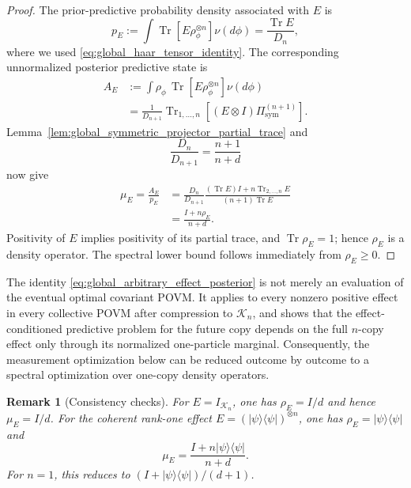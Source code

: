 \documentclass[journal]{IEEEtran}
\newtheorem{remark}[theorem]{Remark}
\newcommand{\ket}[1]{\lvert #1\rangle}
\newcommand{\bra}[1]{\langle #1\rvert}
\begin{document}
\begin{proof}
The prior-predictive probability density associated with \(E\) is
\begin{equation}
    p_E
    :=
    \int
    \operatorname{Tr}\!\left[E\rho_\phi^{\otimes n}\right]\nu(d\phi)
    =
    \frac{\operatorname{Tr}E}{D_n},
    \label{eq:global_effect_prior_predictive_probability}
\end{equation}
where we used \eqref{eq:global_haar_tensor_identity}.  The corresponding
unnormalized posterior predictive state is
\begin{equation}
\begin{split}
    A_E
    &:=
    \int
    \rho_\phi\,
    \operatorname{Tr}\!\left[E\rho_\phi^{\otimes n}\right]\nu(d\phi)\\
    &=
    \frac{1}{D_{n+1}}
    \operatorname{Tr}_{1,\ldots,n}
    \left[
        (E\otimes I)\Pi_{\mathrm{sym}}^{(n+1)}
    \right].
\end{split}
\label{eq:global_effect_unnormalized_posterior}
\end{equation}
Lemma~\ref{lem:global_symmetric_projector_partial_trace} and
\[
    \frac{D_n}{D_{n+1}}=\frac{n+1}{n+d}
\]
now give
\[
\begin{aligned}
    \mu_E
    =\frac{A_E}{p_E}
    &=
    \frac{D_n}{D_{n+1}}
    \frac{(\operatorname{Tr}E)I
    +n\operatorname{Tr}_{2,\ldots,n}E}
    {(n+1)\operatorname{Tr}E}\\
    &=
    \frac{I+n\rho_E}{n+d}.
\end{aligned}
\]
Positivity of \(E\) implies positivity of its partial trace, and
\(\operatorname{Tr}\rho_E=1\); hence \(\rho_E\) is a density operator.  The
spectral lower bound follows immediately from \(\rho_E\ge0\).
\end{proof}

The identity \eqref{eq:global_arbitrary_effect_posterior} is not merely an
evaluation of the eventual optimal covariant POVM.  It applies to every nonzero
positive effect in every collective POVM after compression to
\(\mathcal K_n\), and shows that the effect-conditioned predictive problem
for the future copy depends on the full \(n\)-copy effect only through its
normalized one-particle marginal.  Consequently, the measurement optimization
below can be reduced outcome by outcome to a spectral optimization over
one-copy density operators.

\begin{remark}[Consistency checks]
For \(E=I_{\mathcal K_n}\), one has \(\rho_E=I/d\) and hence
\(\mu_E=I/d\).  For the coherent rank-one effect
\(E=(\ket\psi\bra\psi)^{\otimes n}\), one has
\(\rho_E=\ket\psi\bra\psi\) and
\[
    \mu_E=\frac{I+n\ket\psi\bra\psi}{n+d}.
\]
For \(n=1\), this reduces to
\((I+\ket\psi\bra\psi)/(d+1)\).
\end{remark}
\end{document}
